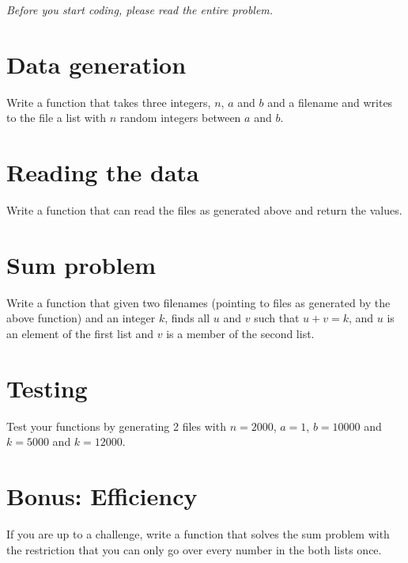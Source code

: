 \begin{questions}
\label{sub:sum_of_lists}

    \emph{Before you start coding, please read the entire problem.}
\begin{parts}
    \part{Data generation}

    Write a function that takes three integers, $n$, $a$ and $b$ and a filename
    and writes to the file a list with $n$ random integers between $a$ and $b$.

    \part{Reading the data}

    Write a function that can read the files as generated above and return the values.

    \part{Sum problem}

    Write a function that given two filenames (pointing to files as generated by the above function) and an integer $k$, finds all $u$ and $v$ such that $u + v = k$, and $u$ is an element of the first list and $v$ is a member of the second list.

    \part{Testing}

    Test your functions by generating 2 files with $n = 2000$, $a = 1$, $b = 10000$
    and $k = 5000$ and $k = 12000$.

    \part{Bonus: Efficiency}

    If you are up to a challenge, write a function that solves the sum problem with
    the restriction that you can only go over every number in the both lists once.

\end{parts}

\end{questions}
